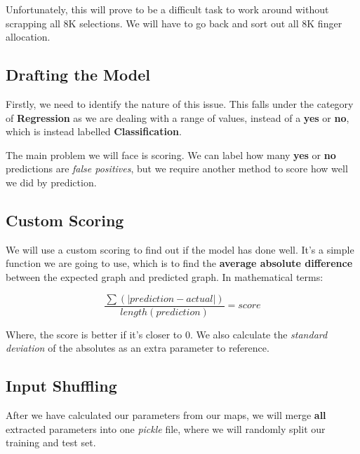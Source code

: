 Unfortunately, this will prove to be a difficult task to work around without scrapping all 8K selections. We will have to go back and sort out all 8K finger allocation. 

\subsection{Drafting the Model}

Firstly, we need to identify the nature of this issue. This falls under the category of \textbf{Regression} as we are dealing with a range of values, instead of a \textbf{yes} or \textbf{no}, which is instead labelled \textbf{Classification}.

The main problem we will face is scoring. We can label how many \textbf{yes} or \textbf{no} predictions are \textit{false positives}, but we require another method to score how well we did by prediction.

\subsection{Custom Scoring}

We will use a custom scoring to find out if the model has done well. It's a simple function we are going to use, which is to find the \textbf{average absolute difference} between the expected graph and predicted graph. In mathematical terms:

$$\frac{\sum \left(|prediction - actual|\right)}{length(prediction)} = score$$

Where, the score is better if it's closer to 0. We also calculate the \textit{standard deviation} of the absolutes as an extra parameter to reference.

\subsection{Input Shuffling}

After we have calculated our parameters from our maps, we will merge \textbf{all} extracted parameters into one \textit{pickle} file, where we will randomly split our training and test set.



